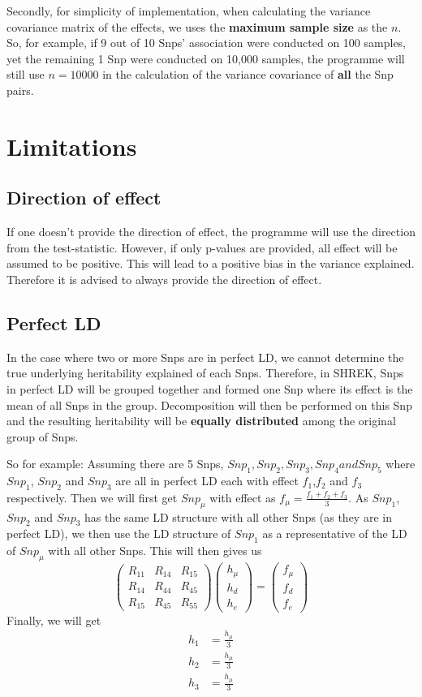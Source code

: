 \documentclass[12pt,a4paper,twoside]{report}
\begin{document}
Secondly, for simplicity of implementation, when calculating the variance covariance matrix of the effects, we uses the \textbf{maximum sample size} as the $n$.
So, for example, if 9 out of 10 Snps' association were conducted on 100 samples, yet the remaining 1 Snp were conducted on 10,000 samples, the programme will still use $n= 10000$ in the calculation of the variance covariance of \textbf{all} the Snp pairs.
\section{Limitations}
\subsection{Direction of effect}
If one doesn't provide the direction of effect, the programme will use the direction from the test-statistic. 
However, if only p-values are provided, all effect will be assumed to be positive. 
This will lead to a positive bias in the variance explained.
Therefore it is advised to always provide the direction of effect.
\subsection{Perfect LD}
In the case where two or more Snps are in perfect LD, we cannot determine the true underlying heritability explained of each Snps.
Therefore, in SHREK, Snps in perfect LD will be grouped together and formed one Snp where its effect is the mean of all Snps in the group.
Decomposition will then be performed on this Snp and the resulting heritability will be \textbf{equally distributed} among the original group of Snps.

So for example:
Assuming there are 5 Snps, $Snp_1, Snp_2, Snp_3, Snp_4 and Snp_5$ where $Snp_1$, $Snp_2$ and $Snp_3$ are all in perfect LD each with effect $f_1$,$f_2$ and $f_3$ respectively.
Then we will first get $Snp_\mu$ with effect as $f_\mu = \frac{f_1+f_2+f_3}{3}$. 
As $Snp_1$, $Snp_2$ and $Snp_3$ has the same LD structure with all other Snps (as they are in perfect LD), we then use the LD structure of $Snp_1$ as a representative of the LD of $Snp_\mu$ with all other Snps. 
This will then gives us
\[ \left( \begin{array}{ccc}
R_{11} & R_{14} & R_{15}\\
R_{14} & R_{44} & R_{45}\\
R_{15} & R_{45} & R_{55}
\end{array} \right)
%
\left( \begin{array}{c}
h_\mu \\
h_d \\
h_e
\end{array} \right)
=
\left( \begin{array}{c}
f_\mu \\
f_d \\
f_e
\end{array} \right)
\]
Finally, we will get
\begin{align*}
h_1 &= \frac{h_\mu}{3} \\
h_2 &= \frac{h_\mu}{3} \\
h_3 &= \frac{h_\mu}{3}
\end{align*}
\end{document}
